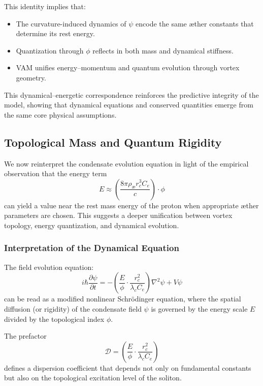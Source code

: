 \documentclass[a4paper,12pt]{article}
\begin{document}
            This identity implies that:
            \begin{itemize}
              \item The curvature-induced dynamics of $\psi$ encode the same æther constants that determine its rest energy.
              \item Quantization through $\phi$ reflects in both mass and dynamical stiffness.
              \item VAM unifies energy–momentum and quantum evolution through vortex geometry.
            \end{itemize}

            This dynamical–energetic correspondence reinforces the predictive integrity of the model, showing that dynamical equations and conserved quantities emerge from the same core physical assumptions.
            \subsection{Topological Mass and Quantum Rigidity}

            We now reinterpret the condensate evolution equation in light of the empirical observation that the energy term
            \[
            E \approx \left( \frac{8\pi \rho_{\text{æ}} r_c^3 C_e}{c} \right) \cdot \phi
            \]
            can yield a value near the rest mass energy of the proton when appropriate æther parameters are chosen. This suggests a deeper unification between vortex topology, energy quantization, and dynamical evolution.

            \subsubsection{Interpretation of the Dynamical Equation}

            The field evolution equation:
            \begin{equation}
            i\hbar \frac{\partial \psi}{\partial t}
            = - \left( \frac{E}{\phi} \cdot \frac{r_c^2}{\lambda_c C_e} \right) \nabla^2 \psi + V \psi
            \end{equation}
            can be read as a modified nonlinear Schrödinger equation, where the spatial diffusion (or rigidity) of the condensate field $\psi$ is governed by the energy scale $E$ divided by the topological index $\phi$.

            The prefactor
            \[
            \mathcal{D} = \left( \frac{E}{\phi} \cdot \frac{r_c^2}{\lambda_c C_e} \right)
            \]
            defines a dispersion coefficient that depends not only on fundamental constants but also on the topological excitation level of the soliton.
\end{document}
